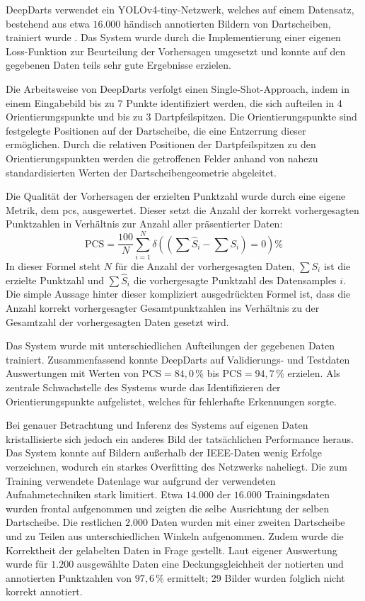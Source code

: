 DeepDarts verwendet ein YOLOv4-tiny-Netzwerk, welches auf einem Datensatz, bestehend aus etwa $16.000$ händisch annotierten Bildern von Dartscheiben, trainiert wurde \cite{deepdarts-data}. Das System wurde durch die Implementierung einer eigenen Loss-Funktion zur Beurteilung der Vorhersagen umgesetzt und konnte auf den gegebenen Daten teils sehr gute Ergebnisse erzielen.

Die Arbeitsweise von DeepDarts verfolgt einen Single-Shot-Approach, indem in einem Eingabebild bis zu 7 Punkte identifiziert werden, die sich aufteilen in 4 Orientierungspunkte und bis zu 3 Dartpfeilspitzen. Die Orientierungspunkte sind festgelegte Positionen auf der Dartscheibe, die eine Entzerrung dieser ermöglichen. Durch die relativen Positionen der Dartpfeilspitzen zu den Orientierungspunkten werden die getroffenen Felder anhand von nahezu standardisierten Werten der Dartscheibengeometrie abgeleitet.

Die Qualität der Vorhersagen der erzielten Punktzahl wurde durch eine eigene Metrik, dem \ac{pcs}, ausgewertet. Dieser setzt die Anzahl der korrekt vorhergesagten Punktzahlen in Verhältnis zur Anzahl aller präsentierter Daten:
\[ \text{PCS} = \frac{100}{N} \sum_{i=1}^{N} \delta \left(\left(\sum \hat{S}_i - \sum S_i\right) = 0\right)\% \]
In dieser Formel steht $N$ für die Anzahl der vorhergesagten Daten, $\sum S_i$ ist die erzielte Punktzahl und $\sum \hat{S}_i$ die vorhergesagte Punktzahl des Datensamples $i$. Die simple Aussage hinter dieser kompliziert ausgedrückten Formel ist, dass die Anzahl korrekt vorhergesagter Gesamtpunktzahlen ins Verhältnis zu der Gesamtzahl der vorhergesagten Daten gesetzt wird.

Das System wurde mit unterschiedlichen Aufteilungen der gegebenen Daten trainiert. Zusammenfassend konnte DeepDarts auf Validierungs- und Testdaten Auswertungen mit Werten von $\text{PCS} = 84,0\,\%$ bis $\text{PCS} = 94,7\,\%$ erzielen. Als zentrale Schwachstelle des Systems wurde das Identifizieren der Orientierungspunkte aufgelistet, welches für fehlerhafte Erkennungen sorgte.

Bei genauer Betrachtung und Inferenz des Systems auf eigenen Daten kristallisierte sich jedoch ein anderes Bild der tatsächlichen Performance heraus. Das System konnte auf Bildern außerhalb der IEEE-Daten wenig Erfolge verzeichnen, wodurch ein starkes Overfitting des Netzwerks naheliegt. Die zum Training verwendete Datenlage war aufgrund der verwendeten Aufnahmetechniken stark limitiert. Etwa $14.000$ der $16.000$ Trainingsdaten wurden frontal aufgenommen und zeigten die selbe Ausrichtung der selben Dartscheibe. Die restlichen $2.000$ Daten wurden mit einer zweiten Dartscheibe und zu Teilen aus unterschiedlichen Winkeln aufgenommen. Zudem wurde die Korrektheit der gelabelten Daten in Frage gestellt. Laut eigener Auswertung wurde für $1.200$ ausgewählte Daten eine Deckungsgleichheit der notierten und annotierten Punktzahlen von $97,6\,\%$ ermittelt; 29 Bilder wurden folglich nicht korrekt annotiert.

